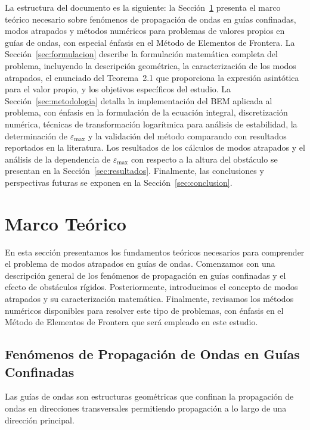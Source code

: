 \documentclass[11pt]{article}
\begin{document}
La estructura del documento es la siguiente: la Sección~\ref{sec:marco_teorico} presenta el marco teórico necesario sobre fenómenos de propagación de ondas en guías confinadas, modos atrapados y métodos numéricos para problemas de valores propios en guías de ondas, con especial énfasis en el Método de Elementos de Frontera. La Sección~\ref{sec:formulacion} describe la formulación matemática completa del problema, incluyendo la descripción geométrica, la caracterización de los modos atrapados, el enunciado del Teorema~2.1 que proporciona la expresión asintótica para el valor propio, y los objetivos específicos del estudio. La Sección~\ref{sec:metodologia} detalla la implementación del BEM aplicada al problema, con énfasis en la formulación de la ecuación integral, discretización numérica, técnicas de transformación logarítmica para análisis de estabilidad, la determinación de $\varepsilon_{\max}$ y la validación del método comparando con resultados reportados en la literatura. Los resultados de los cálculos de modos atrapados y el análisis de la dependencia de $\varepsilon_{\max}$ con respecto a la altura del obstáculo se presentan en la Sección~\ref{sec:resultados}. Finalmente, las conclusiones y perspectivas futuras se exponen en la Sección~\ref{sec:conclusion}.

\section{Marco Teórico}\label{sec:marco_teorico}

En esta sección presentamos los fundamentos teóricos necesarios para comprender el problema de modos atrapados en guías de ondas. Comenzamos con una descripción general de los fenómenos de propagación en guías confinadas y el efecto de obstáculos rígidos. Posteriormente, introducimos el concepto de modos atrapados y su caracterización matemática. Finalmente, revisamos los métodos numéricos disponibles para resolver este tipo de problemas, con énfasis en el Método de Elementos de Frontera que será empleado en este estudio.

\subsection{Fenómenos de Propagación de Ondas en Guías Confinadas}\label{subsec:propagacion}

Las guías de ondas son estructuras geométricas que confinan la propagación de ondas en direcciones transversales permitiendo propagación a lo largo de una dirección principal.
\end{document}
